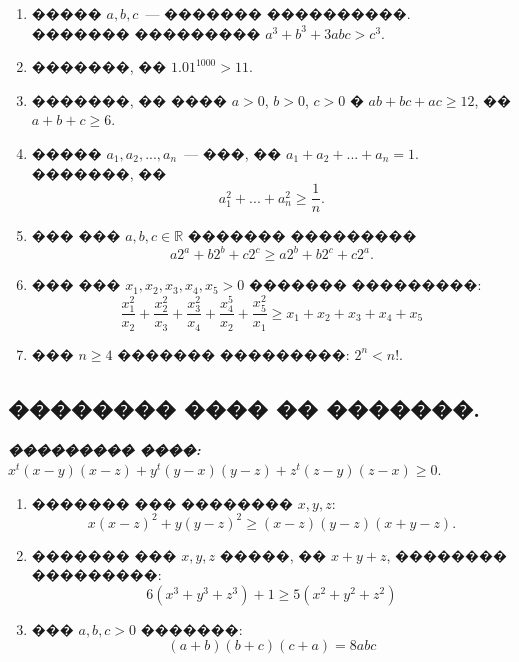 \documentclass[a4paper,12pt]{article}
\begin{document}
\begin{enumerate}
\item ����� $a, b, c$~--- ������� ����������. ������� ��������� $a^{3}+b^{3}+3abc>c^{3}$.

\item �������, �� $1.01^{1000}>11$.

\item �������, �� ���� $a>0$, $b>0$, $c>0$ � $ab+bc+ac\geq 12$, �� $a+b+c\geq 6$.

\item ����� $a_{1},a_{2},...,a_{n}$~--- ���, �� $a_{1}+a_{2}+...+a_{n}=1$. �������, �� $$a_{1}^{2}+...+a_{n}^{2}\geq \frac{1}{n}.$$

\item ��� ��� $a,b,c\in \mathbb{R}$ ������� ��������� $$a2^{a}+b2^{b}+c2^{c}\geq a2^{b}+b2^{c}+c2^{a}.$$

\item ��� ��� $x_{1},x_{2},x_{3},x_{4},x_{5}>0$ ������� ���������: $$\frac{x_{1}^{2}}{x_{2}}+\frac{x_{2}^{2}}{x_{3}}+ \frac{x_{3}^{2}}{x_{4}}+\frac{x_{4}^{5}}{x_{2}} +\frac{x_{5}^{2}}{x_{1}} \geq x_{1}+x_{2}+x_{3}+x_{4}+x_{5}$$

\item ��� $n\geq4$ ������� ���������: $2^{n}<n!$.
\end{enumerate}



\newpage

\begin{center}
\section*{�������� ���� �� �������.}
\end{center}

\textbf{\textit{��������� ����:}} $x^{t}(x-y)(x-z) + y^{t}(y-x)(y-z) + z^{t}(z-y)(z-x) \geq 0$.

\begin{enumerate}
\item ������� ��� �������� $x,y,z$: $$x(x - z)^{
2} + y(y - z)^{
2} \geq (x - z)(y - z)(x + y - z).$$

\item ������� ��� $x,y,z$ �����, �� $x+y+z$, �������� ���������: $$6(x^{3}+y^{3}+z^{3})+1\geq 5(x^{2}+y^{2}+z^{2})$$
    
\item ��� $a,b,c > 0$ �������: $$(a+b)(b+c)(c+a) = 8abc$$

\end{enumerate}
\end{document}
